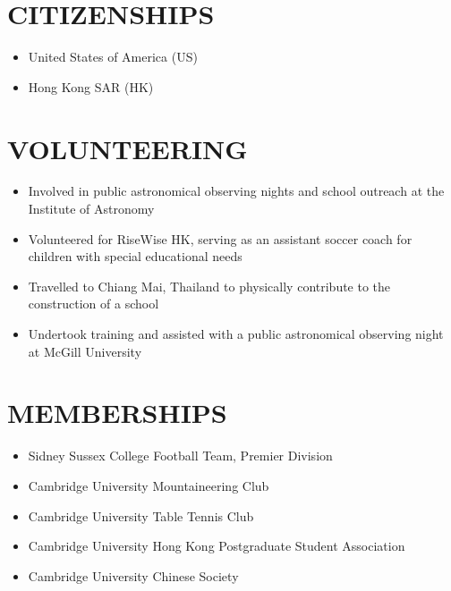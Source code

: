 \documentclass[a4paper,10pt]{extarticle}
\begin{document}
\section*{CITIZENSHIPS}
\begin{itemize}
    \item United States of America (US)

    \item Hong Kong SAR (HK)
\end{itemize}


\section*{VOLUNTEERING}
\begin{itemize}
    \item Involved in public astronomical observing nights and school outreach at the Institute of Astronomy

    \item Volunteered for RiseWise HK, serving as an assistant soccer coach for children with special educational needs

    \item Travelled to Chiang Mai, Thailand to physically contribute to the construction of a school

    \item Undertook training and assisted with a public astronomical observing night at McGill University
\end{itemize}

\section*{MEMBERSHIPS}
\begin{itemize}
    \item Sidney Sussex College Football Team, Premier Division

    \item Cambridge University Mountaineering Club

    \item Cambridge University Table Tennis Club

    \item Cambridge University Hong Kong Postgraduate Student Association

    \item Cambridge University Chinese Society
\end{itemize}
\end{document}
